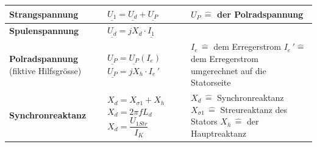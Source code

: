     \begin{longtable}[b]{| C{5cm}| P{8.5cm} | P{5 cm} |}
    	\hline
        \textbf{Strangspannung} 	&
        $\underline{U_1\!} = \underline{U_d\!} + \underline{U_P\!}$ &
        $U_P \, \widehat{=}$ der Polradspannung
        \\ \hline
        
        \textbf{Spulenspannung}	&
        $\underline{U_d} = jX_d\cdot \underline{I_1}$ &
        \\ \hline
        
        \textbf{Polradspannung} \newline (fiktive Hilfsgrösse) &
        $\underline{U_P} = \underline{U_P}\left(I_e\right)$ \newline\newline
        $\underline{U_P} = jX_h\cdot I_{e}\,'$  &
        $I_e \, \widehat{=}$ dem Erregerstrom \newline
        $I_e \,' \widehat{=}$ dem Erregerstrom umgerechnet auf die Statorseite
        \\ \hline
        
        \textbf{Synchronreaktanz} &
        $X_d = X_{\sigma 1} + X_h$ \newline \newline 
        $X_d = 2\pi f L_d$ \newline \newline
        $X_d = \dfrac{U_{1Str}}{I_K}$&
        $X_d \, \widehat{=} $ Synchronreaktanz \newline
        $X_{\sigma 1} \, \widehat{=}$ Streureaktanz des Stators \newline
        $X_h \, \widehat{=}$ der Hauptreaktanz \newline 
        \\ \hline
        

\end{longtable}
